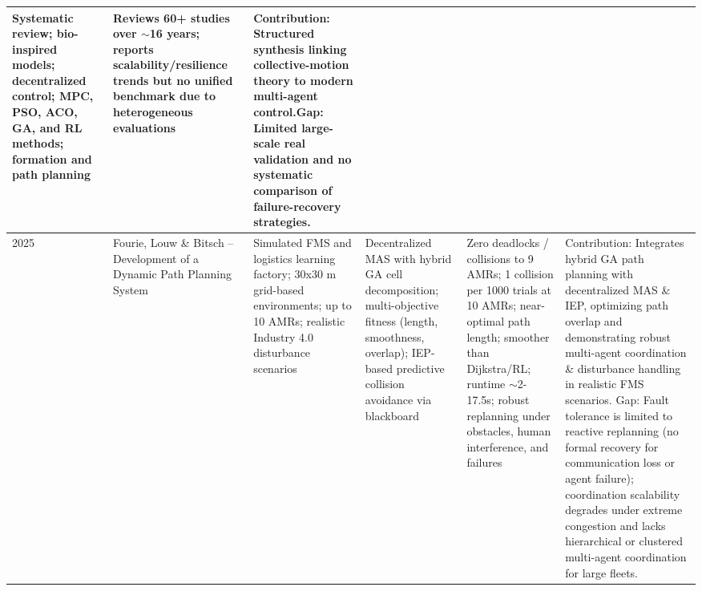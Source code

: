 \documentclass[conference]{IEEEtran}
\begin{document}
\begin{table}[!t]
\begin{tabularx}{\linewidth}{@{}L{0.7cm}L{2.0cm}L{2.0cm}L{3.6cm}L{3.8cm}Y@{}}
  Systematic review; bio-inspired models; decentralized control; MPC, PSO, ACO, GA, and RL methods; formation and path planning &
  Reviews 60+ studies over $\sim$16 years; reports scalability/resilience trends but no unified benchmark due to heterogeneous evaluations &
  Contribution: Structured synthesis linking collective-motion theory to modern multi-agent control.\newline Gap: Limited large-scale real validation and no systematic comparison of failure-recovery strategies. \\ \midrule
\cite{fourie2025development} 2025 &
  Fourie, Louw \& Bitsch -- Development of a Dynamic Path Planning System &
  Simulated FMS and logistics learning factory; 30x30 m grid-based environments; up to 10 AMRs; realistic Industry 4.0 disturbance scenarios &
  Decentralized MAS with hybrid GA cell decomposition; multi-objective fitness (length, smoothness, overlap); IEP-based predictive collision avoidance via blackboard &
  Zero deadlocks / collisions to 9 AMRs; 1 collision per 1000 trials at 10 AMRs; near-optimal path length; smoother than Dijkstra/RL; runtime $\sim$2-17.5s; robust replanning under obstacles, human interference, and failures &
  Contribution: Integrates hybrid GA path planning with decentralized MAS \& IEP, optimizing path overlap and demonstrating robust multi-agent coordination \& disturbance handling in realistic FMS scenarios. \newline Gap: Fault tolerance is limited to reactive replanning (no formal recovery for communication loss or agent failure); coordination scalability degrades under extreme congestion and lacks hierarchical or clustered multi-agent coordination for large fleets.\\ \midrule

\end{tabularx}
\end{table}
\end{document}
